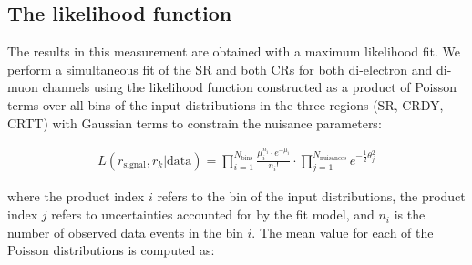 

\subsection{The likelihood function}
\label{sec:likelihood}

The results in this measurement are obtained with a maximum likelihood fit. We perform a simultaneous fit of the SR and both CRs for both di-electron and di-muon channels using the likelihood function constructed as a product of Poisson terms over all bins of the input \mTHH distributions in the three regions (SR, CRDY, CRTT) with Gaussian terms to constrain the nuisance parameters:

\begin{align*}
L(r_{\text{signal}}, r_{k}|\text{data}) = \prod_{i=1}^{N_{\mathrm{bins}}}\frac{\mu_{i}^{n_{i}}\cdot e^{-\mu_{i}}}{n_{i}!}
\cdot \prod_{j=1}^{N_{\mathrm{nuisances}}} e^{-\frac{1}{2}\theta_{j}^{2}}
\end{align*}

\noindent where the product index $i$ refers to the bin of the input distributions, the product index $j$
refers to uncertainties accounted for by the fit model, and $n_i$ is the number of observed data
events in the bin $i$. The mean value for each of the Poisson distributions is computed as:

